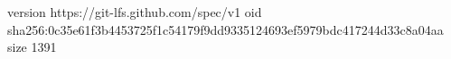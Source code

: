 version https://git-lfs.github.com/spec/v1
oid sha256:0c35e61f3b4453725f1c54179f9dd9335124693ef5979bdc417244d33c8a04aa
size 1391
